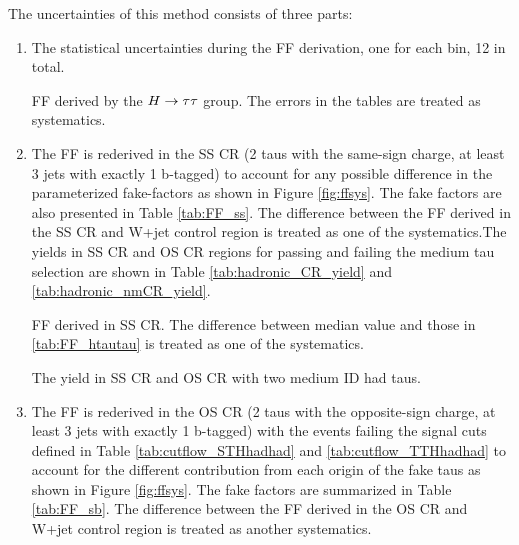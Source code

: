 The uncertainties of this method consists of three parts:
\begin{enumerate}

\item The statistical uncertainties during the FF derivation, one for each bin, 12 in total.

\begin{table}[H]
\caption{FF derived by the $H \rightarrow \tau\tau$ group. The errors in the tables are treated as systematics.}
\label{tab:FF_htautau}

\end{table}

\item The FF is rederived in the SS CR (2 taus with the same-sign charge, at least 3 jets with exactly 1 b-tagged) to account for any possible difference in 
  the parameterized fake-factors as shown in Figure \ref{fig:ffsys}. The fake factors are also presented in Table \ref{tab:FF_ss}. The difference between the FF
  derived in the SS CR and W+jet control region is treated as one of the systematics.The yields in SS CR and OS CR regions for passing and failing the medium tau selection are shown in Table \ref{tab:hadronic_CR_yield} and \ref{tab:hadronic_nmCR_yield}.

\begin{table}[H]
\caption{FF derived in SS CR. The difference between median value and those in \ref{tab:FF_htautau} is treated as one of the systematics.}
\label{tab:FF_ss}

\end{table}

 \begin{table}[H]
\caption{The yield in SS CR and OS CR with two medium ID had taus.}
\label{tab:hadronic_CR_yield}


\end{table}

\item The FF is rederived in the OS CR (2 taus with the opposite-sign charge, at least 3 jets with exactly 1 b-tagged) with the events failing the signal cuts
  defined in Table \ref{tab:cutflow_STHhadhad} and \ref{tab:cutflow_TTHhadhad} to account for the different contribution from each origin of the fake taus as shown in Figure \ref{fig:ffsys}. The fake factors are summarized in Table \ref{tab:FF_sb}. The difference between the FF derived in the OS CR and W+jet control region is treated as another
  systematics.


\end{enumerate}
